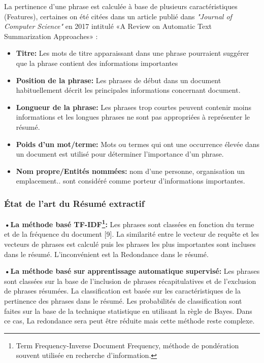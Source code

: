        La pertinence d'une phrase est calculée à base de plusieurs caractéristiques (Features), certaines on été citées dans un article publié dans \emph{"Journal of Computer Science"} en 2017 intitulé «A Review on Automatic Text Summarization Approaches»\cite{ratsa} :
        
        \begin{itemize}
            \item \textbf{Titre:} Les mots de titre apparaissant dans une phrase pourraient suggérer que la phrase contient des informations importantes
            \item \textbf{Position de la phrase:} Les phrases de début dans un document habituellement décrit les principales informations concernant document.
            \item \textbf{Longueur de la phrase:} Les phrases trop courtes peuvent contenir moins informations et les longues phrases ne sont pas appropriées à représenter le résumé.
            \item \textbf{Poids d'un mot/terme:} Mots ou termes qui ont une occurrence élevée dans un document est utilisé pour déterminer l'importance d'un phrase.
            \item \textbf{Nom propre/Entités nommées:} nom d'une personne, organisation un emplacement.. sont considéré comme porteur d'informations importantes.
        \end{itemize}   

        \subsubsection{État de l'art du Résumé extractif}
        \textbf{•La méthode basé TF-IDF\footnote{Term Frequency-Inverse Document Frequency, méthode de pondération souvent utilisée en recherche d'information.}:}
            Les phrases sont classées en fonction du terme et de la fréquence du document \cite{tfidf}[9]. La similarité entre le vecteur de requête et les vecteurs de phrases est calculé puis les phrases les plus importantes sont incluses dans le résumé. L'inconvénient est  la Redondance dans le résumé.\cite{surveysummarization}
            
        \textbf{•La méthode basé sur apprentissage automatique supervisé:} Les phrases sont classées sur la base de l'inclusion de phrases récapitulatives et de l'exclusion de phrases résumées. La classification est basée sur les caractéristiques de la pertinence des phrases dans le résumé. Les probabilités de classification sont faites sur la base de la technique statistique en utilisant la règle de Bayes. Dans ce cas, La redondance sera peut être réduite mais cette méthode reste complexe.\cite{surveysummarization}
            
